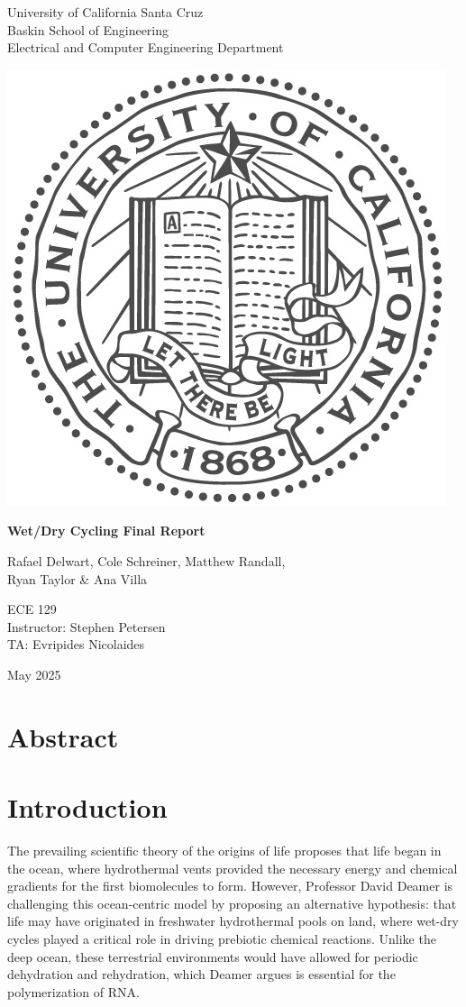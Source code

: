 \documentclass[12pt]{article}
\renewcommand{\maketitle}{
    \thispagestyle{empty}
    \begin{center}

    
    \normalsize
    University of California Santa Cruz \\
    Baskin School of Engineering \\
    Electrical and Computer Engineering Department
    \vspace{1.5cm}

        
    \includegraphics[width=0.4\linewidth]{Images/UC-Unofficial-seal.jpg}
    \vspace{1.5cm}
    
    \Huge\bfseries
    Wet/Dry Cycling Final Report
    \vspace{1cm}
    
    \large
    Rafael Delwart, Cole Schreiner, Matthew Randall, \\
    Ryan Taylor \& Ana Villa
    \vspace{1cm}

    
    \normalsize\normalfont
    ECE 129 \\
    Instructor: Stephen Petersen \\
    TA: Evripides Nicolaides
        
    \normalsize\normalfont
    26 May 2025
    \vspace{2cm}
    
    \end{center}
    \newpage
}
\begin{document}
\maketitle  %

\newpage
\pagestyle{fancy} %
\fancyhead[R]{\thepage} %
\fancyfoot{} %
\setcounter{page}{1} %

\doublespacing

\renewcommand{\contentsname}{}  %
\section*{}
\tableofcontents


\newpage




\section{Abstract}
    

\section{Introduction}

    The prevailing scientific theory of the origins of life proposes that life began in the ocean, where hydrothermal vents provided the necessary energy and chemical gradients for the first biomolecules to form. However, Professor David Deamer is challenging this ocean-centric model by proposing an alternative hypothesis: that life may have originated in freshwater hydrothermal pools on land, where wet-dry cycles played a critical role in driving prebiotic chemical reactions. Unlike the deep ocean, these terrestrial environments would have allowed for periodic dehydration and rehydration, which Deamer argues is essential for the polymerization of RNA. 
    
\end{document}
